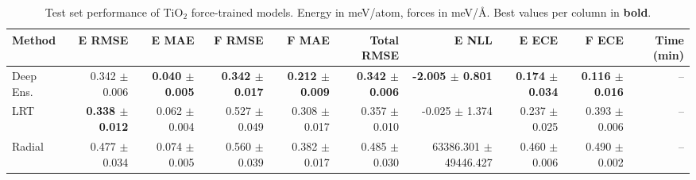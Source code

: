 \begin{table}
\centering
\caption{Test set performance of TiO$_2$ force-trained models. Energy in meV/atom, forces in meV/\AA{}. Best values per column in \textbf{bold}.}
\label{tab:tio2_results}
\begin{tabular}{lrrrrrrrrr}
\toprule
Method & E RMSE & E MAE & F RMSE & F MAE & Total RMSE & E NLL & E ECE & F ECE & Time (min) \\
\midrule
Deep Ens. & 0.342 $\pm$ 0.006 & \textbf{0.040 $\pm$ 0.005} & \textbf{0.342 $\pm$ 0.017} & \textbf{0.212 $\pm$ 0.009} & \textbf{0.342 $\pm$ 0.006} & \textbf{-2.005 $\pm$ 0.801} & \textbf{0.174 $\pm$ 0.034} & \textbf{0.116 $\pm$ 0.016} & -- \\
LRT & \textbf{0.338 $\pm$ 0.012} & 0.062 $\pm$ 0.004 & 0.527 $\pm$ 0.049 & 0.308 $\pm$ 0.017 & 0.357 $\pm$ 0.010 & -0.025 $\pm$ 1.374 & 0.237 $\pm$ 0.025 & 0.393 $\pm$ 0.006 & -- \\
Radial & 0.477 $\pm$ 0.034 & 0.074 $\pm$ 0.005 & 0.560 $\pm$ 0.039 & 0.382 $\pm$ 0.017 & 0.485 $\pm$ 0.030 & 63386.301 $\pm$ 49446.427 & 0.460 $\pm$ 0.006 & 0.490 $\pm$ 0.002 & -- \\
\bottomrule
\end{tabular}
\end{table}